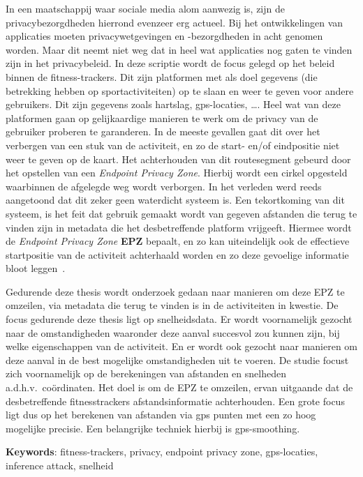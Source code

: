 
In een maatschappij waar sociale media alom aanwezig is, zijn de
privacybezorgdheden hierrond evenzeer erg actueel. Bij het ontwikkelingen van
applicaties moeten privacywetgevingen en -bezorgdheden in acht genomen worden.
Maar dit neemt niet weg dat in heel wat applicaties nog gaten te vinden zijn in
het privacybeleid. In deze scriptie wordt de focus gelegd op het beleid binnen
de fitness-trackers. Dit zijn platformen met als doel gegevens (die betrekking
hebben op sportactiviteiten) op te slaan en weer te geven voor andere
gebruikers. Dit zijn gegevens zoals hartslag, gps-locaties, \ldots. Heel wat
van deze platformen gaan op gelijkaardige manieren te werk om de privacy van de
gebruiker proberen te garanderen. In de meeste gevallen gaat dit over het
verbergen van een stuk van de activiteit, en zo de start- en/of eindpositie
niet weer te geven op de kaart. Het achterhouden van dit routesegment gebeurd
door het opstellen van een \textit{Endpoint Privacy Zone}. Hierbij wordt een
cirkel opgesteld waarbinnen de afgelegde weg wordt verborgen. In het verleden
werd reeds aangetoond dat dit zeker geen waterdicht systeem is. Een
tekortkoming van dit systeem, is het feit dat gebruik gemaakt wordt van gegeven
afstanden die terug te vinden zijn in metadata die het desbetreffende platform
vrijgeeft. Hiermee wordt de \textit{Endpoint Privacy Zone} \textbf{EPZ}
bepaalt, en zo kan uiteindelijk ook de effectieve startpositie van de
activiteit achterhaald worden en zo deze gevoelige informatie bloot
leggen~\cite{Dhondt_Pochat_Voulimeneas_Joosen_Volckaert_2022}.

Gedurende deze thesis wordt onderzoek gedaan naar manieren om deze EPZ te
omzeilen, via metadata die terug te vinden is in de activiteiten in kwestie. De
focus gedurende deze thesis ligt op snelheidsdata. Er wordt voornamelijk
gezocht naar de omstandigheden waaronder deze aanval succesvol zou kunnen zijn,
bij welke eigenschappen van de activiteit. En er wordt ook gezocht naar
manieren om deze aanval in de best mogelijke omstandigheden uit te voeren. De
studie focust zich voornamelijk op de berekeningen van afstanden en snelheden
a.d.h.v.\ coördinaten. Het doel is om de EPZ te omzeilen, ervan uitgaande dat
de desbetreffende fitnesstrackers afstandsinformatie achterhouden. Een grote
focus ligt dus op het berekenen van afstanden via gps punten met een zo hoog
mogelijke precisie. Een belangrijke techniek hierbij is gps-smoothing.


\textbf{Keywords}: fitness-trackers, privacy, endpoint privacy zone,
gps-locaties, inference attack, snelheid